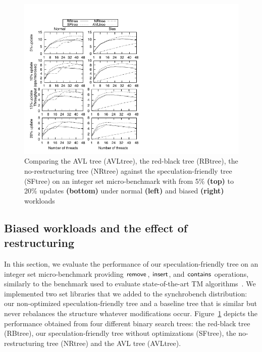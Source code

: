 \begin{figure}[t]
	\begin{center}
	\includegraphics[scale=1.2,clip=true,viewport=9 0 192 228]{Tree/fig/microbench/microbench_avg_4096}
	\caption{Comparing the AVL tree (AVLtree), the red-black tree (RBtree), the no-restructuring tree (NRtree) against the speculation-friendly tree (SFtree) on an integer set micro-benchmark with from 5\% {\bf (top)} to 20\% updates {\bf (bottom)} under normal {\bf (left)} and biased {\bf (right)}  workloads\label{fig:microbench}}
	\end{center}
\end{figure}

\subsection{Biased workloads and the effect of restructuring}\label{ssec:microbench}

In this section, we evaluate the performance of our speculation-friendly tree on an integer set micro-benchmark providing $\act{remove}$, $\act{insert}$, and $\act{contains}$ operations, similarly to the benchmark used to evaluate state-of-the-art TM algorithms~\cite{FFR08,FGG09,DSS10}.
We implemented two set libraries that we added to the synchrobench distribution:
our non-optimized speculation-friendly tree and a baseline tree that is similar but never rebalances the structure whatever modifications occur.
Figure~\ref{fig:microbench} depicts the performance obtained from four different binary search trees: the red-black tree (RBtree), our speculation-friendly tree without optimizations (SFtree), the no-restructuring tree (NRtree) and the AVL tree (AVLtree). 

